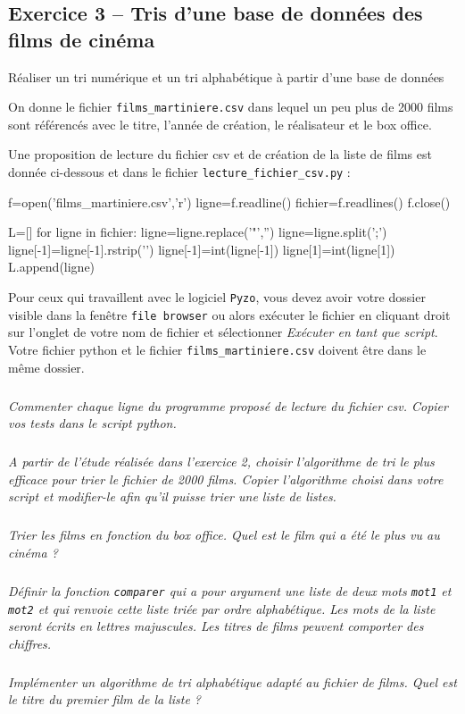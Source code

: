 \documentclass[10pt,fleqn]{article} %
\begin{document}
\begin{multicols}{2}
\section*{Exercice 3 -- Tris d'une base de données des films de cinéma}

\begin{obj}
Réaliser un tri numérique et un tri alphabétique à partir d'une base de données
\end{obj}

On donne le fichier \texttt{films\_martiniere.csv} dans lequel un peu plus de 2000 films sont référencés avec le titre, l'année de création, le réalisateur et le box office.

Une proposition de lecture du fichier csv et de création de la liste de films est donnée ci-dessous et dans le fichier \texttt{lecture\_fichier\_csv.py} :

\begin{python}
f=open('films_martiniere.csv','r')
ligne=f.readline()
fichier=f.readlines()
f.close()

L=[]
for ligne in fichier:
    ligne=ligne.replace('"','')
    ligne=ligne.split(';')
    ligne[-1]=ligne[-1].rstrip('\n')
    ligne[-1]=int(ligne[-1])
    ligne[1]=int(ligne[1])
    L.append(ligne)
\end{python}

Pour ceux qui travaillent avec le logiciel \texttt{Pyzo}, vous devez avoir votre dossier visible dans la fenêtre \texttt{file browser} ou alors exécuter le fichier en cliquant droit sur l'onglet de votre nom de fichier et sélectionner \textit{Exécuter en tant que script}. Votre fichier python et le fichier \texttt{films\_martiniere.csv} doivent être dans le même dossier.

\subparagraph{}
\textit{Commenter chaque ligne du programme proposé de lecture du fichier csv. Copier vos tests dans le script python.}

\subparagraph{}
\textit{A partir de l'étude réalisée dans l'exercice 2, choisir l'algorithme de tri le plus efficace pour trier le fichier de 2000 films. Copier l'algorithme choisi dans votre script et modifier-le afin qu'il puisse trier une liste de listes.}

\subparagraph{}
\textit{Trier les films en fonction du box office. Quel est le film qui a été le plus vu au cinéma ?}

\subparagraph{}
\textit{Définir la fonction \texttt{comparer} qui a pour argument une liste de deux mots \texttt{mot1} et \texttt{mot2} et qui renvoie cette liste triée par ordre alphabétique. Les mots de la liste seront écrits en lettres majuscules. Les titres de films peuvent comporter des chiffres.}

\subparagraph{}
\textit{Implémenter un algorithme de tri alphabétique adapté au fichier de films. Quel est le titre du premier film de la liste ?}




\end{multicols}
\end{document}
